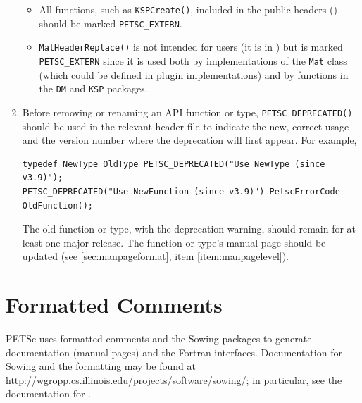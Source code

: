 \begin{enumerate}
\begin{itemize}
\item All functions, such as \lstinline{KSPCreate()}, included in the public headers () should be marked \lstinline{PETSC_EXTERN}.
\item \lstinline{MatHeaderReplace()} is not intended for users (it is in ) but is marked \lstinline{PETSC_EXTERN} since it is used both by implementations of the \lstinline{Mat} class (which could be defined in plugin implementations) and by functions in the \lstinline{DM} and \lstinline{KSP} packages.
\end{itemize}
\item Before removing or renaming an API function or type, \lstinline{PETSC_DEPRECATED()} should be used in the relevant header file to indicate the new, correct usage and the version number where the deprecation will first appear. For example,
\begin{lstlisting}
typedef NewType OldType PETSC_DEPRECATED("Use NewType (since v3.9)");
PETSC_DEPRECATED("Use NewFunction (since v3.9)") PetscErrorCode OldFunction();
\end{lstlisting}
The old function or type, with the deprecation warning, should remain for at least one major release. The function or type's manual page should be updated (see \ref{sec:manpageformat}, item \ref{item:manpagelevel}).
\end{enumerate}

\section{Formatted Comments}

PETSc uses formatted comments and the Sowing packages \cite{gropp1993sowing,gropp1993sowing2} to generate documentation (manual pages) and the Fortran interfaces.
Documentation for Sowing and the formatting may be found at \href{http://wgropp.cs.illinois.edu/projects/software/sowing/}{http://wgropp.cs.illinois.edu/projects/software/sowing/}; in particular, see the documentation for .

